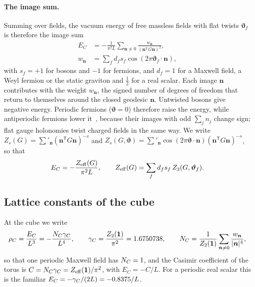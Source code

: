 \paragraph{The image sum.}
Summing over fields, the vacuum energy of free massless fields with flat twists $\bm\vartheta_f$ is therefore the image sum~\cite{DeWitt:1979dd,Banach:1979iy,Bellucci:2009jr}
\begin{equation}
\begin{aligned}
E_C&=-\frac{1}{\pi^2L}\sum_{\bm n\neq0}\frac{w_{\bm n}}{(\bm n^{\mathsf T}G\bm n)^2},\\
w_{\bm n}&=\sum_fd_fs_f\cos(2\pi\bm\vartheta_f\cdot\bm n),
\end{aligned}
\label{eq:rA-imagesum}
\end{equation}
with $s_f=+1$ for bosons and $-1$ for fermions, and $d_f=1$ for a Maxwell field, a Weyl fermion or the static graviton and $\tfrac12$ for a real scalar.
Each image $\bm n$ contributes with the weight $w_{\bm n}$, the signed number of degrees of freedom that return to themselves around the closed geodesic $\bm n$.
Untwisted bosons give negative energy.
Periodic fermions ($\bm\vartheta=0$) therefore raise the energy, while antiperiodic fermions lower it~\cite{Arkani-Hamed:2007ryu,Ibanez:2017kvh}, because their images with odd $\sum_jn_j$ change sign; flat gauge holonomies twist charged fields in the same way.
We write $Z_s(G)=\sum'_{\bm n}(\bm n^{\mathsf T}G\bm n)^{-s}$ and $Z_s(G,\bm\vartheta)=\sum'_{\bm n}\cos(2\pi\bm\vartheta\cdot\bm n)(\bm n^{\mathsf T}G\bm n)^{-s}$, so that
\begin{equation}
E_C=-\frac{Z_{\rm eff}(G)}{\pi^2L},\qquad Z_{\rm eff}(G)=\sum_fd_fs_f\,Z_2(G,\bm\vartheta_f).
\label{eq:rA-Zeff}
\end{equation}

\subsection{Lattice constants of the cube}
\label{rA:lattice}

At the cube we write
\begin{equation}
\rho_C=\frac{E_C}{L^3}=-\frac{N_C\gamma_C}{L^4},\qquad \gamma_C=\frac{Z_2(\mathbf{1})}{\pi^2}=1.6750738,\qquad N_C=\frac{1}{Z_2(\mathbf{1})}\sum_{\bm n\neq0}\frac{w_{\bm n}}{|\bm n|^4},
\label{eq:rA-NC}
\end{equation} %
so that one periodic Maxwell field has $N_C=1$, and the Casimir coefficient of the torus is $C=N_C\gamma_C=Z_{\rm eff}(\mathbf{1})/\pi^2$, with $E_C=-C/L$.
For a periodic real scalar this is the familiar $E_C=-\gamma_C/(2L)=-0.8375/L$.

